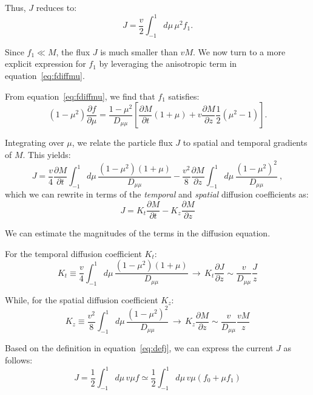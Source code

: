 Thus, \( J \) reduces to:
\begin{equation}
J = \frac{v}{2} \int_{-1}^1 d\mu \, \mu^2 f_1.
\end{equation}

Since \( f_1 \ll M \), the flux \( J \) is much smaller than \( v M \). We now turn to a more explicit expression for \( f_1 \) by leveraging the anisotropic term in equation~\eqref{eq:fdiffmu}.

From equation~\eqref{eq:fdiffmu}, we find that \( f_1 \) satisfies:
\begin{equation}
(1 - \mu^2) \frac{\partial f}{\partial \mu} = \frac{1 - \mu^2}{D_{\mu\mu}} \left[\frac{\partial M}{\partial t}(1 + \mu) + v \frac{\partial M}{\partial z} \frac{1}{2} (\mu^2 - 1)\right].
\end{equation}

Integrating over \( \mu \), we relate the particle flux \( J \) to spatial and temporal gradients of \( M \). This yields:
\begin{equation}
J = \frac{v}{4} \frac{\partial M}{\partial t} \int_{-1}^1 d\mu \, \frac{(1 - \mu^2)(1 + \mu)}{D_{\mu\mu}} - \frac{v^2}{8} \frac{\partial M}{\partial z} \int_{-1}^1 d\mu \, \frac{(1 - \mu^2)^2}{D_{\mu\mu}}~,
\end{equation}
%
which we can rewrite in terms of the \emph{temporal} and \emph{spatial} diffusion coefficients as:
%
\begin{equation}
J = K_t \frac{\partial M}{\partial t} - K_z \frac{\partial M}{\partial z}
\end{equation}

We can estimate the magnitudes of the terms in the diffusion equation.

For the temporal diffusion coefficient \( K_t \):
\[
K_t \equiv \frac{v}{4} \int_{-1}^1 d\mu \, \frac{(1 - \mu^2)(1 + \mu)}{D_{\mu\mu}} \, \rightarrow \, K_t \frac{\partial J}{\partial z}\sim \frac{v}{D_{\mu\mu}}\frac{J}{z}
\]

While, for the spatial diffusion coefficient \( K_z \):
\[
K_z \equiv \frac{v^2}{8} \int_{-1}^1 d\mu \, \frac{(1 - \mu^2)^2}{D_{\mu\mu}} \, \rightarrow \, K_z\frac{\partial M}{\partial z} \sim \frac{v}{D_{\mu\mu}}\frac{vM}{z}
\]

Based on the definition in equation~\eqref{eq:defj}, we can express the current \( J \) as follows:
%
\begin{equation}
J = \frac{1}{2} \int_{-1}^1 d\mu \, v\mu f \simeq \frac{1}{2} \int_{-1}^1 d\mu \, v\mu (f_0 + \mu f_1) 
\end{equation}

